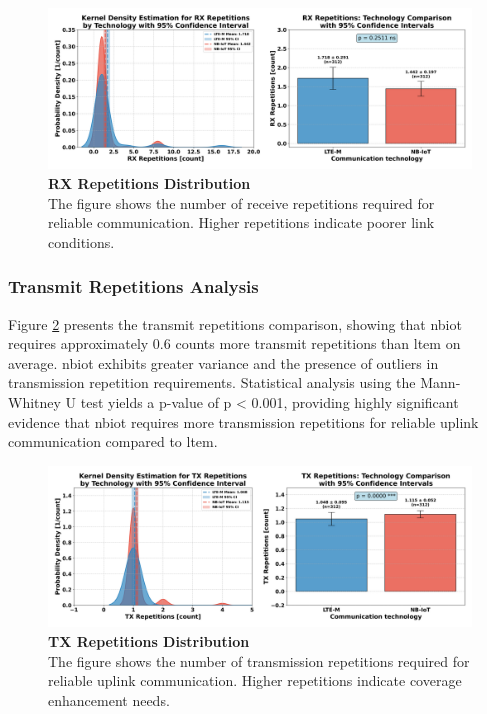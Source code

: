 \documentclass[12pt, english, openany]{book}
\begin{document}
\begin{figure}[htbp]
    \centering
    \includegraphics[width=1.0\textwidth]{rx_repetitions_kde_ci.png}
    \caption{\textbf{RX Repetitions Distribution} \\ The figure shows the number of receive repetitions required for reliable communication. Higher repetitions indicate poorer link conditions.}
    \label{fig:rx_repetitions}
\end{figure}
\FloatBarrier
\subsubsection*{Transmit Repetitions Analysis} \label{sec:transmit_repetitions_analysis}

Figure \ref{fig:tx_repetitions} presents the transmit repetitions comparison, showing that \gls{nbiot} requires approximately 0.6 counts more transmit repetitions than \gls{ltem} on average. \gls{nbiot} exhibits greater variance and the presence of outliers in transmission repetition requirements. Statistical analysis using the Mann-Whitney U test yields a p-value of p < 0.001, providing highly significant evidence that \gls{nbiot} requires more transmission repetitions for reliable uplink communication compared to \gls{ltem}.

\begin{figure}[htbp]
    \centering
    \includegraphics[width=1.0\textwidth]{tx_repetitions_kde_ci.png}
    \caption{\textbf{TX Repetitions Distribution} \\ The figure shows the number of transmission repetitions required for reliable uplink communication. Higher repetitions indicate coverage enhancement needs.}
    \label{fig:tx_repetitions}
\end{figure}
\FloatBarrier
\end{document}
